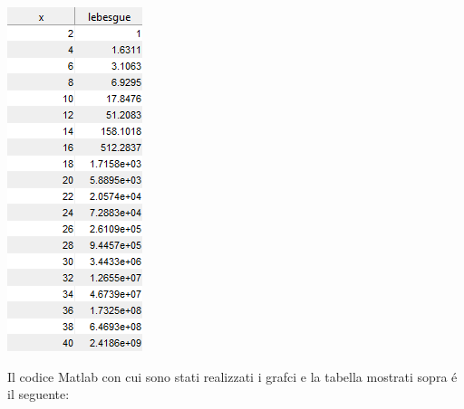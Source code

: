 \begin{center}
	\includegraphics[scale=0.7]{cap4/4_9/4_9.png}
\end{center}

\noindent Il codice Matlab con cui sono stati realizzati i grafci e la tabella mostrati sopra \'e il seguente: \\


